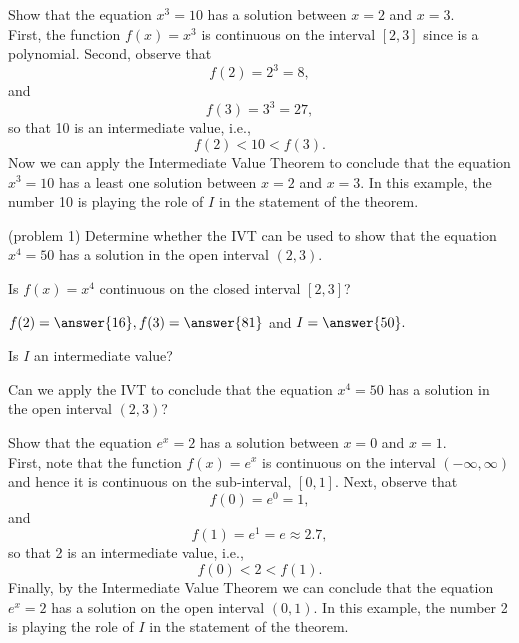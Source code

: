 \documentclass{ximera}
\begin{document}
\begin{example}[example 1]
Show that the equation $x^3 = 10$ has a solution between $x = 2$ and $x = 3$.\\
First, the function $f(x) = x^3$  is continuous on the interval $[2,3]$ 
since is a polynomial. 
Second, observe that 
\[
f(2) = 2^3 = 8,
\]
and 
\[
f(3) = 3^3 = 27,
\] 
so that 10 is an intermediate value, i.e.,
\[f(2) < 10 < f(3).\]
Now we can apply the Intermediate Value Theorem to
conclude that the equation $x^3 = 10$ has a least one solution between $x=2$ and $x=3$. 
In this example, the number 10 is playing the role of $I$ in the statement of the theorem.
\end{example}


\begin{problem}(problem 1)
Determine whether the IVT can be used to show that the equation $x^4 = 50$ has a solution in the open interval $(2,3)$.

Is $f(x) = x^4$ continuous on the closed interval $[2,3]$? 
\begin{center}
\begin{multipleChoice}
\end{multipleChoice}
\end{center}


$f(2) = \answer{16}, f(3) = \answer{81}$ and $I = \answer{50}.$

Is $I$ an intermediate value? 
\begin{multipleChoice}
\end{multipleChoice}

Can we apply the IVT to conclude that the equation $x^4 = 50$ has a solution in the open interval $(2, 3)$?
\begin{multipleChoice}
\end{multipleChoice}
\end{problem}




\begin{example}[example 2]
Show that the equation $e^x =2$ has a solution between $x = 0$ and $x = 1$.\\

First, note that the function $f(x) = e^x$ is continuous on the 
interval $(-\infty, \infty)$ and hence it is continuous on the sub-interval, $[0, 1]$. 
Next, observe that 
\[
f(0) = e^0 = 1,
\]
and 
\[
f(1) = e^1 = e \approx 2.7,
\]
 so that 2 is an intermediate value, i.e.,
\[f(0) < 2 < f(1).\]
Finally, by the Intermediate Value Theorem we can 
conclude that the equation $e^x = 2$ has a solution on the open interval $(0,1)$.
In this example, the number 2 is playing the role of $I$ in the statement of the theorem.
\end{example}
\end{document}
